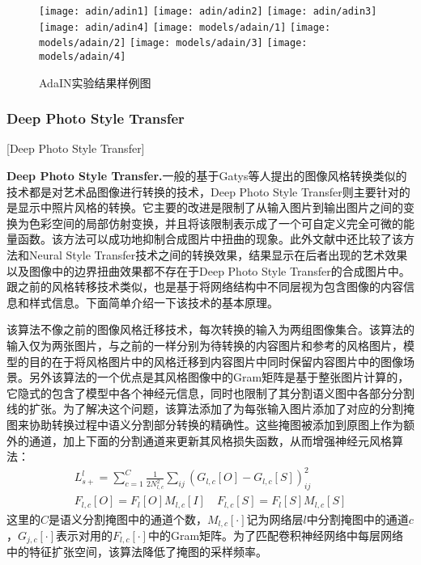 \begin{figure}[ht]
    \centering
    \texttt{[image: adin/adin1]}
    \texttt{[image: adin/adin2]}
    \texttt{[image: adin/adin3]}
    \texttt{[image: adin/adin4]}
    \texttt{[image: models/adain/1]}
    \texttt{[image: models/adain/2]}
    \texttt{[image: models/adain/3]}
    \texttt{[image: models/adain/4]}
    \caption{AdaIN实验结果样例图}
    \label{fig:adin}
\end{figure}


\subsubsection{Deep Photo Style Transfer}[Deep Photo Style Transfer]

\textbf{Deep Photo Style Transfer.}\cite{dpst}\quad  一般的基于Gatys等人提出的图像风格转换类似的技术都是对艺术品图像进行转换的技术，Deep Photo Style Transfer则主要针对的是显示中照片风格的转换。它主要的改进是限制了从输入图片到输出图片之间的变换为色彩空间的局部仿射变换，并且将该限制表示成了一个可自定义完全可微的能量函数。该方法可以成功地抑制合成图片中扭曲的现象。此外文献\cite{dpst}中还比较了该方法和Neural Style Transfer技术之间的转换效果，结果显示在后者出现的艺术效果以及图像中的边界扭曲效果都不存在于Deep Photo Style Transfer的合成图片中。跟之前的风格转移技术类似，也是基于将网络结构中不同层视为包含图像的内容信息和样式信息。下面简单介绍一下该技术的基本原理。

该算法不像之前的图像风格迁移技术，每次转换的输入为两组图像集合。该算法的输入仅为两张图片，与之前的一样分别为待转换的内容图片和参考的风格图片，模型的目的在于将风格图片中的风格迁移到内容图片中同时保留内容图片中的图像场景。另外该算法的一个优点是其风格图像中的Gram矩阵是基于整张图片计算的，它隐式的包含了模型中各个神经元信息，同时也限制了其分割语义图中各部分分割线的扩张。为了解决这个问题，该算法添加了为每张输入图片添加了对应的分割掩图来协助转换过程中语义分割部分转换的精确性。这些掩图被添加到原图上作为额外的通道，加上下面的分割通道来更新其风格损失函数，从而增强神经元风格算法：
\begin{equation}
    \begin{aligned}
    L_{s+}^l=\sum_{c=1}^C \frac{1}{2N_{l,c}^2}\sum_{ij}(G_{l,c}[O]-G_{l,c}[S])_{ij}^2\\
    F_{l,c}[O]=F_l[O]M_{l,c}[I]\quad F_{l,c}[S]=F_l[S]M_{l,c}[S] 
    \end{aligned}
\end{equation}
这里的$C$是语义分割掩图中的通道个数，$M_{l,c}[\cdot]$记为网络层$l$中分割掩图中的通道$c$，$G_{j,c}[\cdot]$表示对用的$F_{l,c}[\cdot]$中的Gram矩阵。为了匹配卷积神经网络中每层网络中的特征扩张空间，该算法降低了掩图的采样频率。

